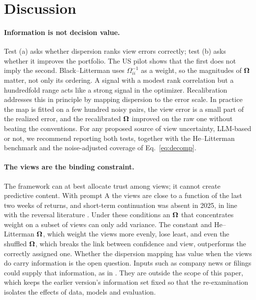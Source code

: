 \section{Discussion}\label{sec:discussion}

\paragraph{Information is not decision value.}
Test (a) asks whether dispersion ranks view errors correctly; test (b) asks whether it improves the portfolio. The US pilot shows that the first does not imply the second. Black--Litterman uses $\Omega_{ii}^{-1}$ as a weight, so the magnitudes of $\bm{\Omega}$ matter, not only its ordering. A signal with a modest rank correlation but a hundredfold range acts like a strong signal in the optimizer. Recalibration addresses this in principle by mapping dispersion to the error scale. In practice the map is fitted on a few hundred noisy pairs, the view error is a small part of the realized error, and the recalibrated $\bm{\Omega}$ improved on the raw one without beating the conventions. For any proposed source of view uncertainty, LLM-based or not, we recommend reporting both tests, together with the He--Litterman benchmark and the noise-adjusted coverage of Eq.~\eqref{eq:decomp}.

\paragraph{The views are the binding constraint.}
The framework can at best allocate trust among views; it cannot create predictive content. With prompt A the views are close to a function of the last two weeks of returns, and short-term continuation was absent in 2025, in line with the reversal literature \citep{jegadeesh1990evidence,lehmann1990fads}. Under these conditions an $\bm{\Omega}$ that concentrates weight on a subset of views can only add variance. The constant and He--Litterman $\bm{\Omega}$, which weight the views more evenly, lose least, and even the shuffled $\bm{\Omega}$, which breaks the link between confidence and view, outperforms the correctly assigned one. Whether the dispersion mapping has value when the views do carry information is the open question. Inputs such as company news or filings could supply that information, as in \citet{lopez2023can}. They are outside the scope of this paper, which keeps the earlier version's information set fixed so that the re-examination isolates the effects of data, models and evaluation.

